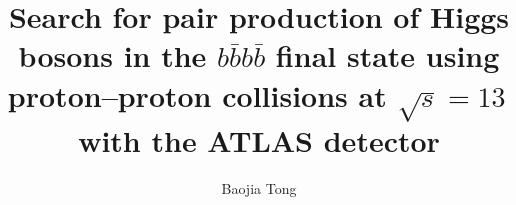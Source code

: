 \title{Search for pair production of Higgs bosons in the $b\bar{b}b\bar{b}$ final state using proton--proton collisions at $\sqrt{s} = 13$\,\TeV{} with the ATLAS detector}
\author{Baojia Tong}






